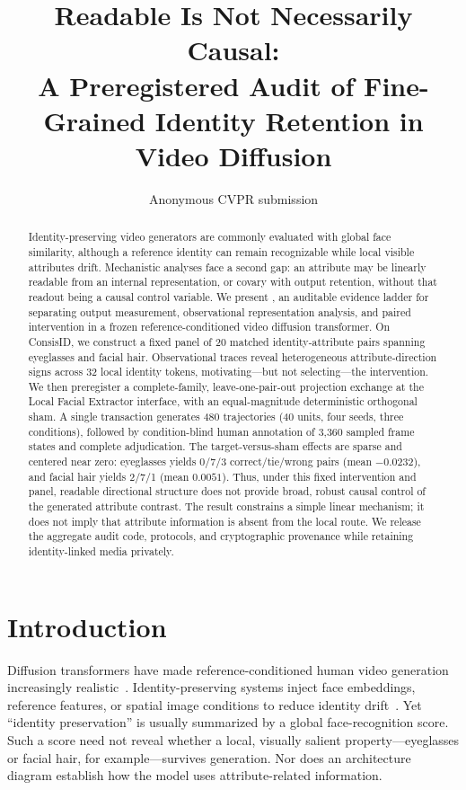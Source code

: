 \documentclass[10pt,twocolumn,letterpaper]{article}
\title{Readable Is Not Necessarily Causal:\\
A Preregistered Audit of Fine-Grained Identity Retention in Video Diffusion}
\author{Anonymous CVPR submission}
\begin{document}
\maketitle

\begin{abstract}
Identity-preserving video generators are commonly evaluated with global face similarity, although a reference identity can remain recognizable while local visible attributes drift.  Mechanistic analyses face a second gap: an attribute may be linearly readable from an internal representation, or covary with output retention, without that readout being a causal control variable.  We present \method, an auditable evidence ladder for separating output measurement, observational representation analysis, and paired intervention in a frozen reference-conditioned video diffusion transformer.  On ConsisID, we construct a fixed panel of 20 matched identity-attribute pairs spanning eyeglasses and facial hair.  Observational traces reveal heterogeneous attribute-direction signs across 32 local identity tokens, motivating—but not selecting—the intervention.  We then preregister a complete-family, leave-one-pair-out projection exchange at the Local Facial Extractor interface, with an equal-magnitude deterministic orthogonal sham.  A single transaction generates 480 trajectories (40 units, four seeds, three conditions), followed by condition-blind human annotation of 3,360 sampled frame states and complete adjudication.  The target-versus-sham effects are sparse and centered near zero: eyeglasses yields 0/7/3 correct/tie/wrong pairs (mean $-0.0232$), and facial hair yields 2/7/1 (mean $0.0051$).  Thus, under this fixed intervention and panel, readable directional structure does not provide broad, robust causal control of the generated attribute contrast.  The result constrains a simple linear mechanism; it does not imply that attribute information is absent from the local route.  We release the aggregate audit code, protocols, and cryptographic provenance while retaining identity-linked media privately.
\end{abstract}

\section{Introduction}
\label{sec:intro}

Diffusion transformers have made reference-conditioned human video generation increasingly realistic~\cite{ho2020ddpm,peebles2023dit,yang2024cogvideox}.  Identity-preserving systems inject face embeddings, reference features, or spatial image conditions to reduce identity drift~\cite{xu2024magicanimate,yuan2025consisid,cui2025hallo3,tu2025stableanimator,zhang2025magicmirror}.  Yet ``identity preservation'' is usually summarized by a global face-recognition score.  Such a score need not reveal whether a local, visually salient property—eyeglasses or facial hair, for example—survives generation.  Nor does an architecture diagram establish how the model uses attribute-related information.
\end{document}
